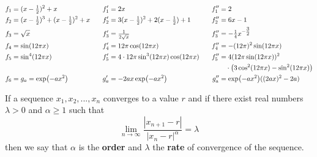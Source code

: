 \fontsize{10}{12}\selectfont
\begin{alignat*}{3}
	f_1 &=(x-\tfrac{1}{2})^2+x
		& f_1' &=2x
		& f_1'' &=2 \\
	f_2 &=(x-\tfrac{1}{2})^3+(x-\tfrac{1}{2})^2+x \hspace{0.3cm}
		& f_2' &= 3(x-\tfrac{1}{2})^2+2(x-\tfrac{1}{2})+1
		& f_2'' &= 6x-1\\
	f_3 &= \sqrt{x}
		& f_3' &=\tfrac{1}{2\sqrt{x}}
		& f_3'' &=-\tfrac{1}{4}x^{-\tfrac{3}{2}} \\
	f_4 &= \sin(12\pi x)
		& f_4' &= 12 \pi \cos(12\pi x)
		& f_4'' &= -(12\pi)^2 \sin(12\pi x)\\
	f_5 &= \sin^4(12\pi x)
		& f_5' &= 4 \cdot 12\pi \sin^3(12\pi x) \cos(12\pi x) \hspace{0.3cm}
		&  f_5'' &= 4  (12\pi \sin(12\pi x))^2 \\ & & & & &~~~\cdot\big(3\cos^2(12\pi x) - \sin^2(12\pi x) \big) \\
	f_6 &=g_a = \exp(-ax^2)
		& g_a' &= -2ax\exp(-ax^2)
		& g_a'' &= \exp(-ax^2) ((2ax)^2-2a)\\
\end{alignat*}
\fontsize{12}{14}\selectfont

If a sequence $x_1,x_2,...,x_n$ converges to a value $r$ and if there exist real numbers $\lambda >0 $ and $\alpha \geq 1$ such that
\begin{equation}
	\lim_{n \to \infty} \frac{|x_{n+1}-r|}{|x_n-r|^\alpha}= \lambda
\end{equation} 
then we say that $\alpha$ is the \textbf{order} and $\lambda$ the \textbf{rate} of convergence of the sequence.

